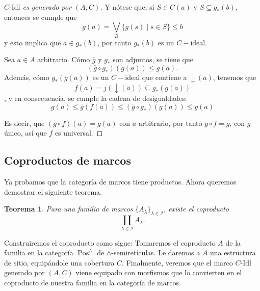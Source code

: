 \documentclass[12pt,letterpaper,titlepage]{article}
\newtheorem*{thm}{Teorema}
\theoremstyle{definition}
\newcommand\down{{\downarrow}}
\renewcommand\inf{\wedge}
\newcommand\scr[1]{\mathscr{#1}}
\newcommand\<{\langle}
\renewcommand\>{\rangle}
\newcommand\Idl{\text{-}\mathrm{Idl}}
\DeclareMathOperator{\Pos}{Pos}
\begin{document}
\begin{proof}[$C\Idl$ es generado por $(A,C)$]
    Y nótese que, si $S\in C(a)$ y $S\subseteq g_*(b)$, entonces se cumple que
    \begin{equation*}
        g(a)= \bigvee_B\{g(s)\mid s\in S\}\leq b
    \end{equation*}
    y esto implica que $a\in g_*(b)$, por tanto $g_*(b)$ es un $C-$ideal. 

    Sea $a\in A$ arbitrario. Cómo $\overline{g}$ y $g_*$ son adjuntos, se tiene que
    \begin{equation*}
        (\overline{g}\circ g_*)(g(a))\leq g(a).
    \end{equation*}
    Además, cómo $g_*(g(a))$ es un $C-$ideal que contiene a $\down(a)$, tenemos que $$f(a)=j(\down(a))\subseteq g_*(g(a))$$, y en consecuencia, se cumple la cadena de desigualdades:
    \begin{equation*}
        g(a)\leq\overline{g}(f(a))\leq(\overline{g}\circ g_*)(g(a))\leq g(a)
    \end{equation*}

    Es decir, que $(\overline{g}\circ f)(a)=g(a)$
    con $a$ arbitrario,
    por tanto $\overline{g}\circ f = g$,
    con $\overline{g}$ único, así que $f$ es universal.
\end{proof}

\subsection{Coproductos de marcos}

Ya probamos que la categoría de marcos tiene productos.
Ahora queremos demostrar el siguiente teorema.

\begin{thm}
Para una familia de marcos $\{A_\lambda\}_{\lambda\in\scr I}$,
existe el coproducto
\[\coprod_{\lambda\in\scr I} A_\lambda.\]
\end{thm}

Construiremos el coproducto como sigue:
Tomaremos el coproducto $A$ de la familia
en la categoría $\Pos^\inf$ de $\inf$-semiretículas.
Le daremos a $A$ una estructura de sitio, equipándole una
cobertura $C$.
Finalmente, veremos que el marco $C\Idl$ generado por $(A,C)$
viene equipado con morfismos que lo convierten en el coproducto
de nuestra familia en la categoría de marcos.
\end{document}
